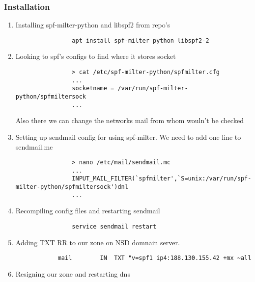 \documentclass[10pt]{article}
\begin{document}
        \subsubsection{Installation}
        \begin{enumerate}
            \item Installing spf-milter-python and libspf2 from repo's
            \begin{verbatim}
                apt install spf-milter python libspf2-2
            \end{verbatim}
            \item Looking to spf's configs to find where it stores socket
            \begin{verbatim}
                > cat /etc/spf-milter-python/spfmilter.cfg
                ...
                socketname = /var/run/spf-milter-python/spfmiltersock
                ...
            \end{verbatim}
            Also there we can change the networks mail from whom wouln't be checked
            \item Setting up sendmail config for using spf-milter. We need to add one line to sendmail.mc
            \begin{verbatim}
                > nano /etc/mail/sendmail.mc
                ...
                INPUT_MAIL_FILTER(`spfmilter',`S=unix:/var/run/spf-milter-python/spfmiltersock')dnl
                ...
            \end{verbatim}
            \item Recompiling config files and restarting sendmail
            \begin{verbatim}
                service sendmail restart
            \end{verbatim}
            \item Adding TXT RR to our zone on NSD domnain server.
            \begin{verbatim}
            mail        IN  TXT "v=spf1 ip4:188.130.155.42 +mx ~all
            \end{verbatim}
            \item Resigning our zone and restarting dns
        \end{enumerate}
\end{document}
